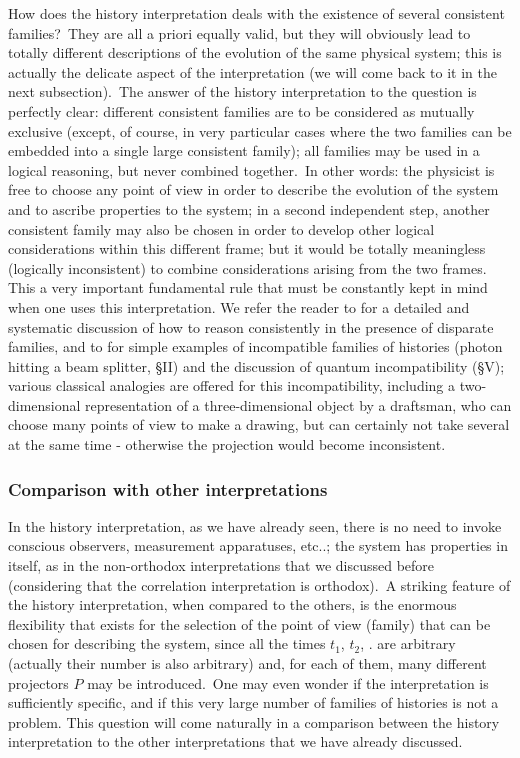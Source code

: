 \documentclass[12pt,onecolumn]{article}%
\begin{document}
How does the history interpretation deals with the existence of several
consistent families?\ They are all a priori equally valid, but they will
obviously lead to totally different descriptions of the evolution of the same
physical system; this is actually the delicate aspect of the interpretation
(we will come back to it in the next subsection).\ The answer of the history
interpretation to the question is perfectly clear: different consistent
families are to be considered as mutually exclusive (except, of course, in
very particular cases where the two families can be embedded into a single
large consistent family); all families may be used in a logical reasoning, but
never combined together.\ In other words: the physicist is free to choose any
point of view in order to describe the evolution of the system and to ascribe
properties to the system; in a second independent step, another consistent
family may also be chosen in order to develop other logical considerations
within this different frame; but it would be totally meaningless (logically
inconsistent) to combine considerations arising from the two frames. This a
very important fundamental rule that must be constantly kept in mind when one
uses this interpretation. We refer the reader to \cite{Griffiths-2} for a
detailed and systematic discussion of how to reason consistently in the
presence of disparate families, and to \cite{Griffiths-3} for simple examples
of incompatible families of histories (photon hitting a beam splitter, \S II)
and the discussion of quantum incompatibility (\S V); various classical
analogies are offered for this incompatibility, including a two-dimensional
representation of a three-dimensional object by a draftsman, who can choose
many points of view to make a drawing, but can certainly not take several at
the same time - otherwise the projection would become inconsistent.

\subsubsection{Comparison with other interpretations}

In the history interpretation, as we have already seen, there is no need to
invoke conscious observers, measurement apparatuses, etc..; the system has
properties in itself, as in the non-orthodox interpretations that we discussed
before (considering that the correlation interpretation is orthodox).\ A
striking feature of the history interpretation, when compared to the others,
is the enormous flexibility that exists for the selection of the point of view
(family) that can be chosen for describing the system, since all the times
$t_{1}$, $t_{2}$, . are arbitrary (actually their number is also arbitrary)
and, for each of them, many different projectors $P$ may be introduced.\ One
may even wonder if the interpretation is sufficiently specific, and if this
very large number of families of histories is not a problem. This question
will come naturally in a comparison between the history interpretation to the
other interpretations that we have already discussed.
\end{document}
